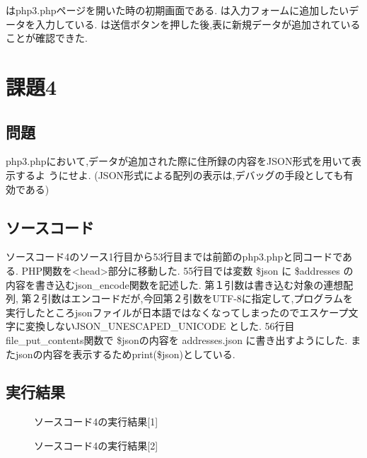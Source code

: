 \documentclass[a4j,10pt]{jsarticle}
\begin{document}
はphp3.phpページを開いた時の初期画面である.
は入力フォームに追加したいデータを入力している.
は送信ボタンを押した後,表に新規データが追加されていることが確認できた.

\section{課題4}

\subsection{問題}


php3.phpにおいて,データが追加された際に住所録の内容をJSON形式を用いて表示するよ
うにせよ.
(JSON形式による配列の表示は,デバッグの手段としても有効である)

\subsection{ソースコード}

ソースコード4のソース1行目から53行目までは前節のphp3.phpと同コードである. PHP関数を<head>部分に移動した.
55行目では変数 \$json に \$addresses の内容を書き込むjson\_encode関数を記述した. 第１引数は書き込む対象の連想配列,
第２引数はエンコードだが,今回第２引数をUTF-8に指定して,プログラムを実行したところjsonファイルが日本語ではなくなってしまったのでエスケープ文字に変換しないJSON\_UNESCAPED\_UNICODE とした.
56行目file\_put\_contents関数で \$jsonの内容を addresses.json に書き出すようにした. またjsonの内容を表示するためprint(\$json)としている.


\subsection{実行結果}

\begin{figure}[H]
  \centering
  \caption{ソースコード4の実行結果[1]}
\label{fig:fig6}
\end{figure}

\begin{figure}[H]
  \centering
  \caption{ソースコード4の実行結果[2]}
\label{fig:fig7}
\end{figure}
\end{document}
